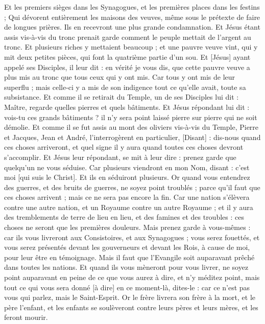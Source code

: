 \begin{multicols}{2}
Et les premiers sièges dans les Synagogues, et les premières places dans les festins ;
Qui dévorent entièrement les maisons des veuves, même sous le prétexte de faire de longues prières. Ils en recevront une plus grande condamnation.
Et Jésus étant assis vis-à-vis du tronc prenait garde comment le peuple mettait de l'argent au tronc.
Et plusieurs riches y mettaient beaucoup ; et une pauvre veuve vint, qui y mit deux petites pièces, qui font la quatrième partie d'un sou.
Et [Jésus] ayant appelé ses Disciples, il leur dit : en vérité je vous dis, que cette pauvre veuve a plus mis au tronc que tous ceux qui y ont mis.
Car tous y ont mis de leur superflu ; mais celle-ci y a mis de son indigence tout ce qu'elle avait, toute sa subsistance.
\VerseOne{}Et comme il se retirait du Temple, un de ses Disciples lui dit : Maître, regarde quelles pierres et quels bâtiments.
Et Jésus répondant lui dit : vois-tu ces grands bâtiments ? il n'y sera point laissé pierre sur pierre qui ne soit démolie.
Et comme il se fut assis au mont des oliviers vis-à-vis du Temple, Pierre et Jacques, Jean et André, l’interrogèrent en particulier,
[Disant] : dis-nous quand ces choses arriveront, et quel signe il y aura quand toutes ces choses devront s'accomplir.
Et Jésus leur répondant, se mit à leur dire : prenez garde que quelqu'un ne vous séduise.
Car plusieurs viendront en mon Nom, disant : c'est moi [qui suis le Christ]. Et ils en séduiront plusieurs.
Or quand vous entendrez des guerres, et des bruits de guerres, ne soyez point troublés ; parce qu'il faut que ces choses arrivent ; mais ce ne sera pas encore la fin.
Car une nation s'élèvera contre une autre nation, et un Royaume contre un autre Royaume ; et il y aura des tremblements de terre de lieu en lieu, et des famines et des troubles : ces choses ne seront que les premières douleurs.
Mais prenez garde à vous-mêmes : car ils vous livreront aux Consistoires, et aux Synagogues ; vous serez fouettés, et vous serez présentés devant les gouverneurs et devant les Rois, à cause de moi, pour leur être en témoignage.
Mais il faut que l'Evangile soit auparavant prêché dans toutes les nations.
Et quand ils vous mèneront pour vous livrer, ne soyez point auparavant en peine de ce que vous aurez à dire, et n'y méditez point, mais tout ce qui vous sera donné [à dire] en ce moment-là, dites-le : car ce n'est pas vous qui parlez, mais le Saint-Esprit.
Or le frère livrera son frère à la mort, et le père l'enfant, et les enfants se soulèveront contre leurs pères et leurs mères, et les feront mourir.

\end{multicols}
